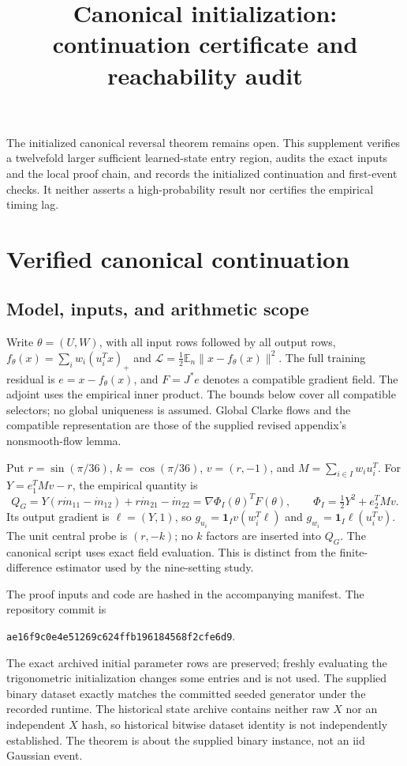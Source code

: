 \documentclass[10pt]{article}
\title{Canonical initialization: continuation certificate and reachability audit}
\author{}\date{}
\newcommand{\E}{\mathbb E}
\begin{document}
\maketitle
\noindent
The initialized canonical reversal theorem remains open. This supplement
verifies a twelvefold larger sufficient learned-state entry region, audits
the exact inputs and the local proof chain, and records the initialized
continuation and first-event checks. It neither asserts a high-probability
result nor certifies the empirical timing lag.
\section{Verified canonical continuation}
\providecommand{\E}{\mathbb E}
\subsection{Model, inputs, and arithmetic scope}
Write $\theta=(U,W)$, with all input rows followed by all output rows,
$f_\theta(x)=\sum_iw_i(u_i^Tx)_+$ and
$\mathcal L=\frac12\mathbb E_n\|x-f_\theta(x)\|^2$.
The full training residual is $e=x-f_\theta(x)$, and $F=J^*e$ denotes a
compatible gradient field. The adjoint uses the empirical inner product.
The bounds below cover all compatible selectors; no global uniqueness is
assumed. Global Clarke flows and the compatible representation are those
of the supplied revised appendix's nonsmooth-flow lemma.

Put $r=\sin(\pi/36)$, $k=\cos(\pi/36)$, $v=(r,-1)$, and
$M=\sum_{i\in I}w_iu_i^T$. For $Y=e_1^TMv-r$, the empirical quantity is
\[
 Q_G=Y(r\dot m_{11}-\dot m_{12})+r\dot m_{21}-\dot m_{22}
     =\nabla\Phi_I(\theta)^TF(\theta),\qquad
 \Phi_I=\tfrac12Y^2+e_2^TMv.
\]
Its output gradient is $\ell=(Y,1)$, so
$g_{u_i}=\mathbf1_Iv(w_i^T\ell)$ and
$g_{w_i}=\mathbf1_I\ell(u_i^Tv)$.
The unit central probe is $(r,-k)$; no $k$ factors are inserted into $Q_G$.
The canonical script uses exact field evaluation. This is distinct from the
finite-difference estimator used by the nine-setting study.

The proof inputs and code are hashed in the accompanying manifest. The
repository commit is
\begin{center}\texttt{ae16f9c0e4e51269c624ffb196184568f2cfe6d9}.\end{center}
The exact archived initial parameter rows are preserved; freshly evaluating
the trigonometric initialization changes some entries and is not used.
The supplied binary dataset exactly matches the committed seeded generator
under the recorded runtime. The historical state archive contains neither
raw $X$ nor an independent $X$ hash, so historical bitwise dataset identity
is not independently established. The theorem is about the supplied binary
instance, not an iid Gaussian event.
\end{document}
